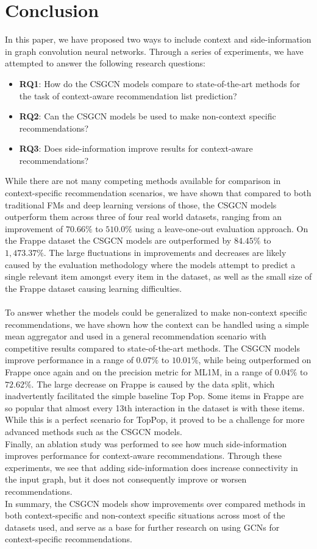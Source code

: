 \section{Conclusion}\label{sec:conclusion}
In this paper, we have proposed two ways to include context and side-information in graph convolution neural networks.
Through a series of experiments, we have attempted to answer the following research questions:
\begin{itemize}
    \item \textbf{RQ1}: How do the CSGCN models compare to state-of-the-art methods for the task of context-aware recommendation list prediction?
    \item \textbf{RQ2}: Can the CSGCN models be used to make non-context specific recommendations?
    \item \textbf{RQ3}: Does side-information improve results for context-aware recommendations?
\end{itemize}
While there are not many competing methods available for comparison in context-specific recommendation scenarios, we have shown that compared to both traditional FMs and deep learning versions of those, the CSGCN models outperform them across three of four real world datasets, ranging from an improvement of $70.66\%$ to $510.0\%$ using a leave-one-out evaluation approach.
On the Frappe dataset the CSGCN models are outperformed by $84.45\%$ to $1,473.37\%$.
The large fluctuations in improvements and decreases are likely caused by the evaluation methodology where the models attempt to predict a single relevant item amongst every item in the dataset, as well as the small size of the Frappe dataset causing learning difficulties.\\\\
To answer whether the models could be generalized to make non-context specific recommendations, we have shown how the context can be handled using a simple mean aggregator and used in a general recommendation scenario with competitive results compared to state-of-the-art methods.
The CSGCN models improve performance in a range of $0.07\%$ to $10.01\%$, while being outperformed on Frappe once again and on the precision metric for ML1M, in a range of $0.04\%$ to $72.62\%$.
The large decrease on Frappe is caused by the data split, which inadvertently facilitated the simple baseline Top Pop.
Some items in Frappe are so popular that almost every 13th interaction in the dataset is with these items.
While this is a perfect scenario for TopPop, it proved to be a challenge for more advanced methods such as the CSGCN models.
\\
Finally, an ablation study was performed to see how much side-information improves performance for context-aware recommendations.
Through these experiments, we see that adding side-information does increase connectivity in the input graph, but it does not consequently improve or worsen recommendations.
\\
In summary, the CSGCN models show improvements over compared methods in both context-specific and non-context specific situations across most of the datasets used, and serve as a base for further research on using GCNs for context-specific recommendations.

